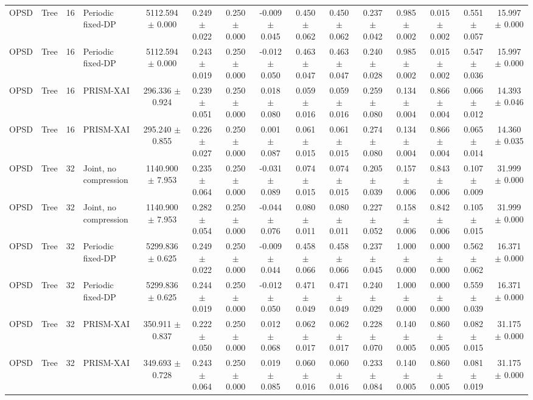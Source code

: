 \begin{tabular}{llllccccccccccc}
OPSD & Tree & 16 & Periodic fixed-DP & 5112.594 $\pm$ 0.000 & 0.249 $\pm$ 0.022 & 0.250 $\pm$ 0.000 & -0.009 $\pm$ 0.045 & 0.450 $\pm$ 0.062 & 0.450 $\pm$ 0.062 & 0.237 $\pm$ 0.042 & 0.985 $\pm$ 0.002 & 0.015 $\pm$ 0.002 & 0.551 $\pm$ 0.057 & 15.997 $\pm$ 0.000 \\
OPSD & Tree & 16 & Periodic fixed-DP & 5112.594 $\pm$ 0.000 & 0.243 $\pm$ 0.019 & 0.250 $\pm$ 0.000 & -0.012 $\pm$ 0.050 & 0.463 $\pm$ 0.047 & 0.463 $\pm$ 0.047 & 0.240 $\pm$ 0.028 & 0.985 $\pm$ 0.002 & 0.015 $\pm$ 0.002 & 0.547 $\pm$ 0.036 & 15.997 $\pm$ 0.000 \\
OPSD & Tree & 16 & PRISM-XAI & 296.336 $\pm$ 0.924 & 0.239 $\pm$ 0.051 & 0.250 $\pm$ 0.000 & 0.018 $\pm$ 0.080 & 0.059 $\pm$ 0.016 & 0.059 $\pm$ 0.016 & 0.259 $\pm$ 0.080 & 0.134 $\pm$ 0.004 & 0.866 $\pm$ 0.004 & 0.066 $\pm$ 0.012 & 14.393 $\pm$ 0.046 \\
OPSD & Tree & 16 & PRISM-XAI & 295.240 $\pm$ 0.855 & 0.226 $\pm$ 0.027 & 0.250 $\pm$ 0.000 & 0.001 $\pm$ 0.087 & 0.061 $\pm$ 0.015 & 0.061 $\pm$ 0.015 & 0.274 $\pm$ 0.080 & 0.134 $\pm$ 0.004 & 0.866 $\pm$ 0.004 & 0.065 $\pm$ 0.014 & 14.360 $\pm$ 0.035 \\
OPSD & Tree & 32 & Joint, no compression & 1140.900 $\pm$ 7.953 & 0.235 $\pm$ 0.064 & 0.250 $\pm$ 0.000 & -0.031 $\pm$ 0.089 & 0.074 $\pm$ 0.015 & 0.074 $\pm$ 0.015 & 0.205 $\pm$ 0.039 & 0.157 $\pm$ 0.006 & 0.843 $\pm$ 0.006 & 0.107 $\pm$ 0.009 & 31.999 $\pm$ 0.000 \\
OPSD & Tree & 32 & Joint, no compression & 1140.900 $\pm$ 7.953 & 0.282 $\pm$ 0.054 & 0.250 $\pm$ 0.000 & -0.044 $\pm$ 0.076 & 0.080 $\pm$ 0.011 & 0.080 $\pm$ 0.011 & 0.227 $\pm$ 0.052 & 0.158 $\pm$ 0.006 & 0.842 $\pm$ 0.006 & 0.105 $\pm$ 0.015 & 31.999 $\pm$ 0.000 \\
OPSD & Tree & 32 & Periodic fixed-DP & 5299.836 $\pm$ 0.625 & 0.249 $\pm$ 0.022 & 0.250 $\pm$ 0.000 & -0.009 $\pm$ 0.044 & 0.458 $\pm$ 0.066 & 0.458 $\pm$ 0.066 & 0.237 $\pm$ 0.045 & 1.000 $\pm$ 0.000 & 0.000 $\pm$ 0.000 & 0.562 $\pm$ 0.062 & 16.371 $\pm$ 0.000 \\
OPSD & Tree & 32 & Periodic fixed-DP & 5299.836 $\pm$ 0.625 & 0.244 $\pm$ 0.019 & 0.250 $\pm$ 0.000 & -0.012 $\pm$ 0.050 & 0.471 $\pm$ 0.049 & 0.471 $\pm$ 0.049 & 0.240 $\pm$ 0.029 & 1.000 $\pm$ 0.000 & 0.000 $\pm$ 0.000 & 0.559 $\pm$ 0.039 & 16.371 $\pm$ 0.000 \\
OPSD & Tree & 32 & PRISM-XAI & 350.911 $\pm$ 0.837 & 0.222 $\pm$ 0.050 & 0.250 $\pm$ 0.000 & 0.012 $\pm$ 0.068 & 0.062 $\pm$ 0.017 & 0.062 $\pm$ 0.017 & 0.228 $\pm$ 0.070 & 0.140 $\pm$ 0.005 & 0.860 $\pm$ 0.005 & 0.082 $\pm$ 0.015 & 31.175 $\pm$ 0.000 \\
OPSD & Tree & 32 & PRISM-XAI & 349.693 $\pm$ 0.728 & 0.243 $\pm$ 0.064 & 0.250 $\pm$ 0.000 & 0.019 $\pm$ 0.085 & 0.060 $\pm$ 0.016 & 0.060 $\pm$ 0.016 & 0.233 $\pm$ 0.084 & 0.140 $\pm$ 0.005 & 0.860 $\pm$ 0.005 & 0.081 $\pm$ 0.019 & 31.175 $\pm$ 0.000 \\
\bottomrule
\end{tabular}
